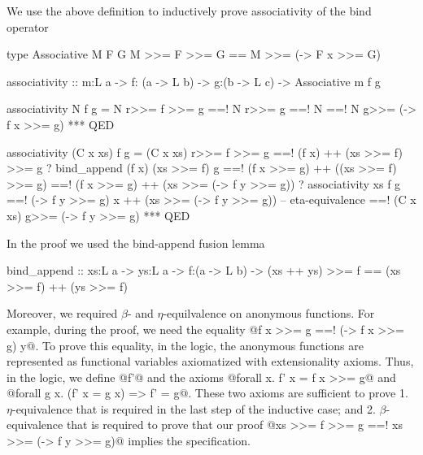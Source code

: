 We use the above definition to inductively prove
associativity of the bind operator

\begin{code}
  type Associative M F G
   {  M >>= F >>= G
   == M >>= (\x -> F x >>= G) }

  associativity
    :: m:L a
    -> f: (a -> L b)
    -> g:(b -> L c)
    -> Associative m f g

  associativity N f g
    =   N r>>= f >>= g
    ==! N r>>= g
    ==! N
    ==! N g>>= (\x -> f x >>= g)
    *** QED

  associativity (C x xs) f g
    =   (C x xs) r>>= f    >>= g
    ==! (f x) ++ (xs >>= f) >>= g
        ? bind_append (f x) (xs >>= f) g
    ==! (f x >>= g) ++ ((xs >>= f) >>= g)
    ==!    (f x >>= g)
        ++ (xs >>= (\y -> f y >>= g))
        ? associativity xs f g
    ==!    (\y -> f y >>= g) x
        ++ (xs >>= (\y -> f y >>= g))
        -- eta-equivalence
    ==! (C x xs) g>>= (\y -> f y >>= g)
    *** QED
\end{code}

In the proof we used the bind-append fusion lemma
\begin{code}
  bind_append
    :: xs:L a
    -> ys:L a
    -> f:(a -> L b)
    -> { (xs ++ ys) >>= f == (xs >>= f) ++ (ys >>= f) }
\end{code}

Moreover, we required $\beta$- and $\eta$-equilvalence on
anonymous functions.
For example, during the proof, we need the equality
@f x >>= g ==! (\x -> f x >>= g) y@.
%
To prove this equality, in the logic,
the anonymous functions are represented as functional variables
axiomatized with extensionality axioms.
%
Thus, in the logic, we define @f'@ and the axioms
@forall x. f' x = f x >>= g@ and
@forall g x. (f' x = g x) => f' = g@.
%
These two axioms are sufficient to prove
1. $\eta$-equivalence that is required in the last step
of the inductive case; and
2. $\beta$-equivalence that is required to prove that our proof
@xs >>= f >>= g ==! xs >>= (\y -> f y >>= g)@
implies the specification.
